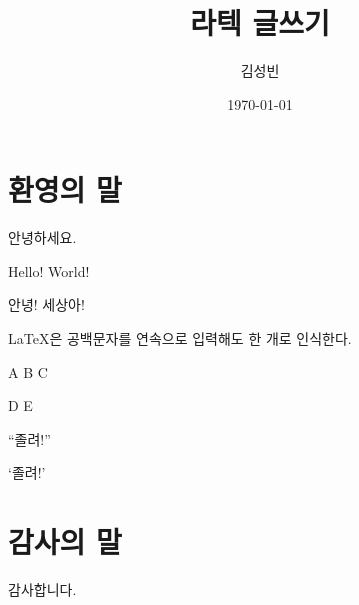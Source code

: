 \documentclass{article}
\title{라텍 글쓰기}
\author{김성빈}
\date{\today}
\begin{document}
\maketitle
\tableofcontents

\section{환영의 말}
안녕하세요.

Hello! World!

안녕! 세상아!

\LaTeX{}은 공백문자를      연속으로 입력해도 한     개로 인식한다.

A         B C

D  E

``졸려!''

`졸려!'

\section{감사의 말}
감사합니다.
\end{document}
